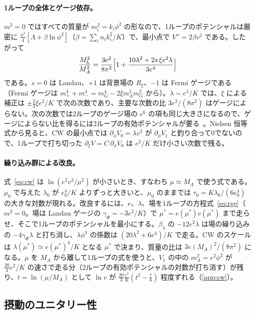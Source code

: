 \documentclass[a4paper,10pt]{ltjsarticle}
\begin{document}
\paragraph{1ループの全体とゲージ依存。}$m^2=0$ ではすべての質量が $m_i^2=k_i\phi^2$ の形なので、1ループのポテンシャルは厳密に $\frac{\phi^4}4[\Lambda+\beta\ln\phi^2]$（$\beta=\sum_in_ik_i^2/K$）で、最小点で $V''=2\beta v^2$ である。したがって
\begin{equation}
\frac{M_h^2}{M_A^2}=\frac{3e^2}{8\pi^2}\Bigl[1+\frac{10\lambda^2+2s\,\xi e^2\lambda}{3e^4}\Bigr]
\label{eq:cwratio}
\end{equation}
である。$s=0$ は Landau、$+1$ は背景場の $R_\xi$、$-1$ は Fermi ゲージである（Fermi ゲージは $m_+^4+m_-^4=m_G^4-2\xi m_A^2m_G^2$ から）。$\lambda\sim e^4/K$ では、$\xi$ による補正は $\pm\frac23\xi e^2/K$ で次の次数であり、主要な次数の比 $3e^2/(8\pi^2)$ はゲージによらない。次の次数では2ループのゲージ場の $e^6$ の項も同じ大きさになるので、ゲージによらない比を得るには2ループの有効ポテンシャルが要る~\cite{afs15}。Nielsen 恒等式から見ると、CW の最小点では $\partial_\phi V_0=\lambda v^3$ が $\partial_\phi V_1$ と釣り合って0でないので、1ループで打ち切った $\partial_\xi V=C\,\partial_\phi V_0$ は $e^2/K$ だけ小さい次数で残る。

\paragraph{繰り込み群による改良。}式~\eqref{eq:cw} は $\ln(e^2v^2/\mu^2)$ が小さいとき、すなわち $\mu\simeq M_A$ で使う式である。$\mu_0$ で与えた $\lambda_0$ が $e_0^4/K$ よりずっと大きいと、$\mu_0$ のままでは $\tau_0=K\lambda_0/(6e_0^4)$ の大きな対数が現れる。改良するには、$e$、$\lambda$、場を1ループの方程式~\eqref{eq:rge}（$m^2=0$。場は Landau ゲージの $\gamma_\Phi=-3e^2/K$）で $\mu^*=e(\mu^*)v(\mu^*)$ まで走らせ、そこで1ループのポテンシャルを最小にする。$\beta_\lambda$ の $-12e^2\lambda$ は場の繰り込みの $-4\gamma_\Phi\lambda$ と打ち消し、$\lambda\phi^4$ の係数は $(20\lambda^2+6e^4)/K$ で走る。CW のスケールは $\lambda(\mu^*)\simeq e(\mu^*)^4/K$ となる $\mu^*$ で決まり、質量の比は $3e(M_A)^2/(8\pi^2)$ になる。$\mu$ を $M_A$ から離して1ループの式を使うと、$V_1$ の中の $m_A^2=e^2\phi^2$ が $\frac{20}3e^2/K$ の速さで走る分（2ループの有効ポテンシャルの対数が打ち消す）が残り、$t=\ln(\mu/M_A)$ として $\ln v$ が $\frac{20}3\frac{e^2}K(t^2-\frac t6)$ 程度ずれる（\ref{app:cw}）。

\subsection{摂動のユニタリー性}\label{sec:unitarity}
\end{document}
